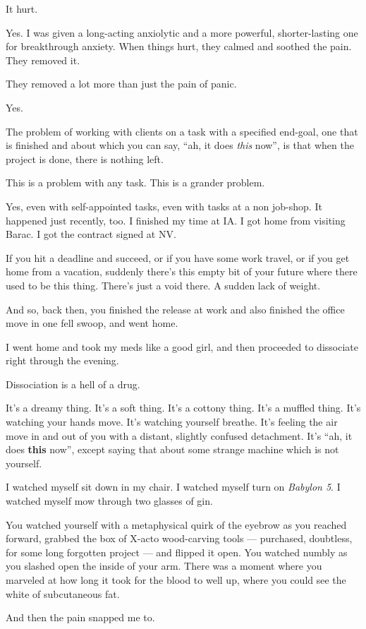 \begin{paracol}{2}
\begin{leftcolumn}
\begin{ally}
It hurt.
\end{ally}
Yes. I was given a long-acting anxiolytic and a more powerful, shorter-lasting one for breakthrough anxiety. When things hurt, they calmed and soothed the pain. They removed it.

\begin{ally}
They removed a lot more than just the pain of panic.
\end{ally}
Yes.
\newpage

\noindent The problem of working with clients on a task with a specified end-goal, one that is finished and about which you can say, ``ah, it does \emph{this} now'', is that when the project is done, there is nothing left.

\begin{ally}
This is a problem with any task. This is a grander problem.
\end{ally}
Yes, even with self-appointed tasks, even with tasks at a non job-shop. It happened just recently, too. I finished my time at IA. I got home from visiting Barac. I got the contract signed at NV.

If you hit a deadline and succeed, or if you have some work travel, or if you get home from a vacation, suddenly there's this empty bit of your future where there used to be this thing. There's just a void there. A sudden lack of weight.

\begin{ally}
And so, back then, you finished the release at work and also finished the office move in one fell swoop, and went home.
\end{ally}
I went home and took my meds like a good girl, and then proceeded to dissociate right through the evening.

Dissociation is a hell of a drug.

\begin{ally}
It's a dreamy thing. It's a soft thing. It's a cottony thing. It's a muffled thing. It's watching your hands move. It's watching yourself breathe. It's feeling the air move in and out of you with a distant, slightly confused detachment. It's ``ah, it does \textbf{this} now'', except saying that about some strange machine which is not yourself.
\end{ally}
I watched myself sit down in my chair. I watched myself turn on \emph{Babylon 5}. I watched myself mow through two glasses of gin.

\begin{ally}
You watched yourself with a metaphysical quirk of the eyebrow as you reached forward, grabbed the box of X-acto wood-carving tools --- purchased, doubtless, for some long forgotten project --- and flipped it open. You watched numbly as you slashed open the inside of your arm. There was a moment where you marveled at how long it took for the blood to well up, where you could see the white of subcutaneous fat.
\end{ally}
And then the pain snapped me to.
\newpage


\end{leftcolumn}
\end{paracol}
